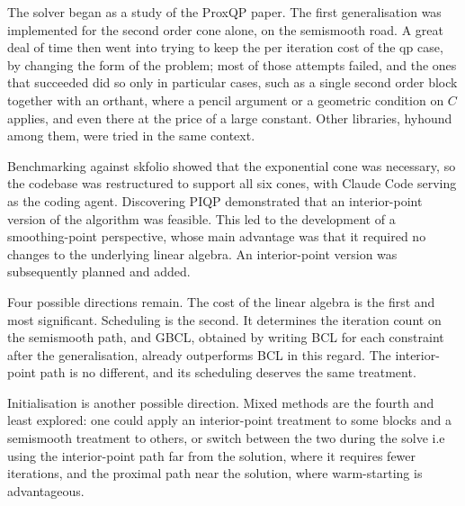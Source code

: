 \documentclass[a4paper,11pt]{book}
\theoremstyle{plain}
\theoremstyle{definition}
\theoremstyle{remark}
\numberwithin{equation}{chapter}
\numberwithin{algorithm}{chapter}
\begin{document}
	The solver began as a study of the ProxQP paper. The first generalisation was
	implemented for the second order cone alone, on the semismooth road. A great
	deal of time then went into trying to keep the per iteration cost of the
	qp case, by changing the form of the problem; most of those attempts
	failed, and the ones that succeeded did so only in particular cases, such as a
	single second order block together with an orthant, where a pencil argument or
	a geometric condition on $C$ applies, and even there at the price of a large
	constant. Other libraries, hyhound among them, were tried in the same context.
	
	Benchmarking against skfolio showed that the exponential cone was necessary, so the codebase was restructured to support all six cones, with Claude Code serving as the coding agent. Discovering PIQP demonstrated that an interior-point version of the algorithm was feasible. This led to the development of a smoothing-point perspective, whose main advantage was that it required no changes to the underlying linear algebra. An interior-point version was subsequently planned and added.
	
	Four possible directions remain. The cost of the linear algebra is the first and most significant. Scheduling is the second. It determines the iteration count on the semismooth path, and GBCL, obtained by writing BCL for each constraint after the generalisation, already outperforms BCL in this regard. The interior-point path is no different, and its scheduling deserves the same treatment.
	
	Initialisation is another possible direction. Mixed methods are the fourth and least explored: one could apply an interior-point treatment to some blocks and a semismooth treatment to others, or switch between the two during the solve i.e using the interior-point path far from the solution, where it requires fewer iterations, and the proximal path near the solution, where warm-starting is advantageous.
	
\end{document}
